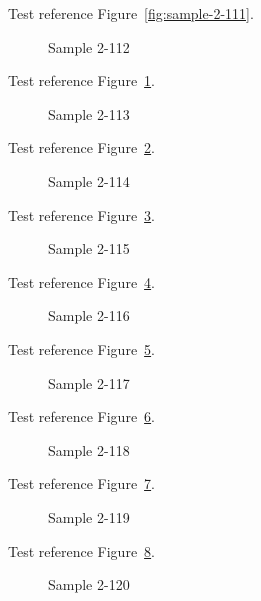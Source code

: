 Test reference Figure~\ref{fig:sample-2-111}.

\begin{figure}[tbhp]
\caption{Sample 2-112}
\label{fig:sample-2-112}
\end{figure}

Test reference Figure~\ref{fig:sample-2-112}.

\begin{figure}[tbhp]
\caption{Sample 2-113}
\label{fig:sample-2-113}
\end{figure}

Test reference Figure~\ref{fig:sample-2-113}.

\begin{figure}[tbhp]
\caption{Sample 2-114}
\label{fig:sample-2-114}
\end{figure}

Test reference Figure~\ref{fig:sample-2-114}.

\begin{figure}[tbhp]
\caption{Sample 2-115}
\label{fig:sample-2-115}
\end{figure}

Test reference Figure~\ref{fig:sample-2-115}.

\begin{figure}[tbhp]
\caption{Sample 2-116}
\label{fig:sample-2-116}
\end{figure}

Test reference Figure~\ref{fig:sample-2-116}.

\begin{figure}[tbhp]
\caption{Sample 2-117}
\label{fig:sample-2-117}
\end{figure}

Test reference Figure~\ref{fig:sample-2-117}.

\begin{figure}[tbhp]
\caption{Sample 2-118}
\label{fig:sample-2-118}
\end{figure}

Test reference Figure~\ref{fig:sample-2-118}.

\begin{figure}[tbhp]
\caption{Sample 2-119}
\label{fig:sample-2-119}
\end{figure}

Test reference Figure~\ref{fig:sample-2-119}.

\begin{figure}[tbhp]
\caption{Sample 2-120}
\label{fig:sample-2-120}
\end{figure}

